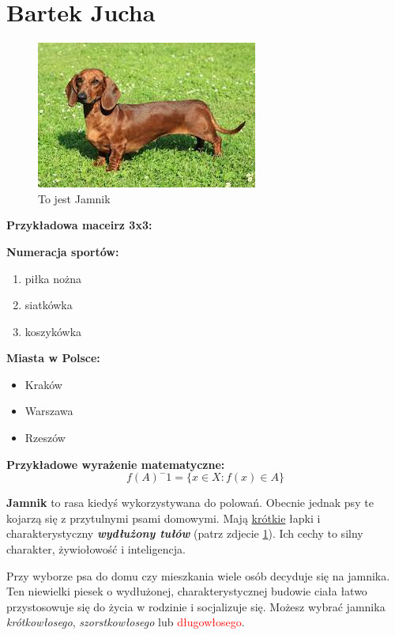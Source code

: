 \section{Bartek Jucha}
\label{sec:bartekjucha}
\begin{figure}[h]
    \centering
    \includegraphics{pictures/jamnik.jpg}
    \caption{To jest Jamnik}
    \label{fig:jamnik}
\end{figure}



\textbf{Przykładowa maceirz 3x3:}




\textbf{Numeracja sportów:}
\begin{enumerate}
    \item piłka nożna
    \item siatkówka
    \item koszykówka
\end{enumerate}

\textbf{Miasta w Polsce:}
\begin{itemize}
    \item Kraków
    \item Warszawa
    \item Rzeszów
\end{itemize}



\textbf{Przykładowe wyrażenie matematyczne:}
\[f(A)^-1=\{x\in X:f(x)\in A\}\]

\newpage \textbf{Jamnik}  to rasa kiedyś wykorzystywana do polowań. Obecnie jednak psy te kojarzą się z przytulnymi psami domowymi. Mają \underline{krótkie} łapki i charakterystyczny \textit{\textbf{wydłużony tułów}} (patrz zdjecie \ref{fig:jamnik}). Ich cechy to silny charakter, żywiołowość i inteligencja. \par
Przy wyborze psa do domu czy mieszkania wiele osób decyduje się na jamnika. Ten niewielki piesek o wydłużonej, charakterystycznej budowie ciała łatwo przystosowuje się do życia w rodzinie i socjalizuje się. Możesz wybrać jamnika \textit{krótkowłosego}, \textit{szorstkowłosego} lub \textcolor{red}{długowłosego}.
